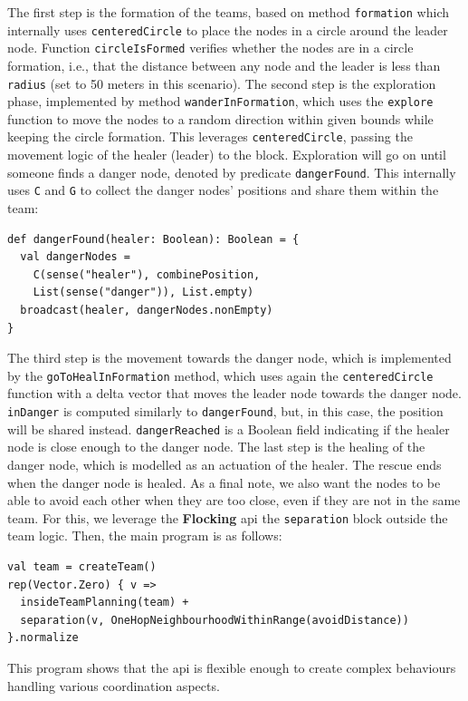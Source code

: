 The first step is the formation of the teams, 
 based on method \lstinline|formation| which
 internally uses \lstinline|centeredCircle| 
  to place the nodes in a circle around the leader node. 
 Function \lstinline|circleIsFormed| verifies whether the nodes are in a circle formation, i.e., that the distance between any node and the leader is less than \lstinline|radius| (set to 50 meters in this scenario).
%
The second step is the exploration phase, 
 implemented by method \lstinline|wanderInFormation|, 
 which uses the \lstinline|explore| function to move the nodes to a random direction
 within given bounds while keeping the circle formation.
 This leverages \lstinline|centeredCircle|,  passing 
 the movement logic of the healer (leader) to the block.
Exploration will go on until someone finds a danger node, 
 denoted by predicate \lstinline|dangerFound|.
This internally uses \lstinline|C| and \lstinline|G| to collect the danger nodes' positions
 and share them within the team:
\begin{lstlisting}
def dangerFound(healer: Boolean): Boolean = {
  val dangerNodes = 
    C(sense("healer"), combinePosition, 
    List(sense("danger")), List.empty)
  broadcast(healer, dangerNodes.nonEmpty)
}
\end{lstlisting}
%
The third step is the movement towards the danger node, 
 which is implemented by the \lstinline|goToHealInFormation| method, 
 which uses again the \lstinline|centeredCircle| function
 with a delta vector that moves the leader node towards the danger node.
\lstinline|inDanger| is computed similarly to \lstinline|dangerFound|, 
 but, in this case, the position will be shared instead. %
 \lstinline|dangerReached| is a Boolean field indicating if the healer node is close enough to the danger node.
The last step is the healing of the danger node, which is modelled as an actuation of the healer. %
 The rescue ends when the danger node is healed.
As a final note, we also want the nodes to be able to avoid 
 each other when they are too close, even if they are not in the same team.
 For this, we leverage the \textbf{Flocking} \ac{api} the \texttt{separation} block outside the team logic.
Then, the main program is as follows:
\begin{lstlisting}
val team = createTeam()
rep(Vector.Zero) { v =>
  insideTeamPlanning(team) + 
  separation(v, OneHopNeighbourhoodWithinRange(avoidDistance))
}.normalize
\end{lstlisting}
This program shows that the \ac{api} 
 is flexible enough to create complex behaviours handling various coordination aspects.
%

